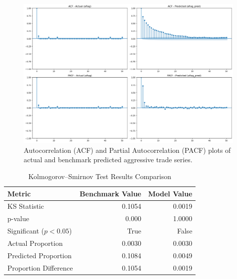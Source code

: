\begin{figure}[H]
    \centering
    \includegraphics[width=0.95\linewidth]{figures/ACF_181330_benchmark.png}
    \caption{Autocorrelation (ACF) and Partial Autocorrelation (PACF) plots of actual and benchmark predicted aggressive trade series.}
    \label{fig:acf-pacf-com}
\end{figure}


\begin{table}[H]
    \centering
    \caption{Kolmogorov--Smirnov Test Results Comparison}
    \label{tb:ks-test-com}
    \begin{tabular}{lrr}
    \toprule
    \textbf{Metric} & \textbf{Benchmark Value} & \textbf{Model Value}\\
    \midrule
    KS Statistic & 0.1054 & 0.0019 \\
    p-value & 0.000 & 1.0000 \\
    Significant ($p < 0.05$) & True & False \\
    Actual Proportion & 0.0030 & 0.0030 \\
    Predicted Proportion & 0.1084 & 0.0049 \\
    Proportion Difference & 0.1054 & 0.0019 \\
    \bottomrule
    \end{tabular}
\end{table}

